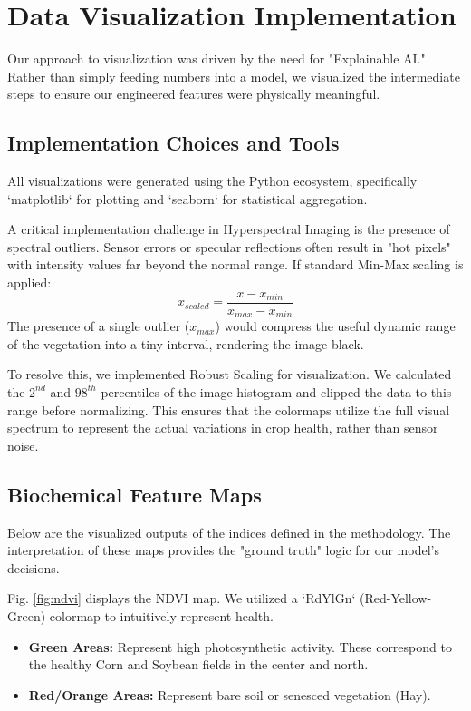\documentclass[conference]{IEEEtran}
\begin{document}
\section{Data Visualization Implementation}

Our approach to visualization was driven by the need for "Explainable AI." Rather than simply feeding numbers into a model, we visualized the intermediate steps to ensure our engineered features were physically meaningful.

\subsection{Implementation Choices and Tools}
All visualizations were generated using the Python ecosystem, specifically `matplotlib` for plotting and `seaborn` for statistical aggregation.

A critical implementation challenge in Hyperspectral Imaging is the presence of spectral outliers. Sensor errors or specular reflections often result in "hot pixels" with intensity values far beyond the normal range. If standard Min-Max scaling is applied:
\begin{equation}
    x_{scaled} = \frac{x - x_{min}}{x_{max} - x_{min}}
\end{equation}
The presence of a single outlier ($x_{max}$) would compress the useful dynamic range of the vegetation into a tiny interval, rendering the image black.

To resolve this, we implemented Robust Scaling for visualization. We calculated the $2^{nd}$ and $98^{th}$ percentiles of the image histogram and clipped the data to this range before normalizing. This ensures that the colormaps utilize the full visual spectrum to represent the actual variations in crop health, rather than sensor noise.

\subsection{Biochemical Feature Maps}
Below are the visualized outputs of the indices defined in the methodology. The interpretation of these maps provides the "ground truth" logic for our model's decisions.

Fig. \ref{fig:ndvi} displays the NDVI map. We utilized a `RdYlGn` (Red-Yellow-Green) colormap to intuitively represent health.
\begin{itemize}
    \item \textbf{Green Areas:} Represent high photosynthetic activity. These correspond to the healthy Corn and Soybean fields in the center and north.
    \item \textbf{Red/Orange Areas:} Represent bare soil or senesced vegetation (Hay).
\end{itemize}
\end{document}
